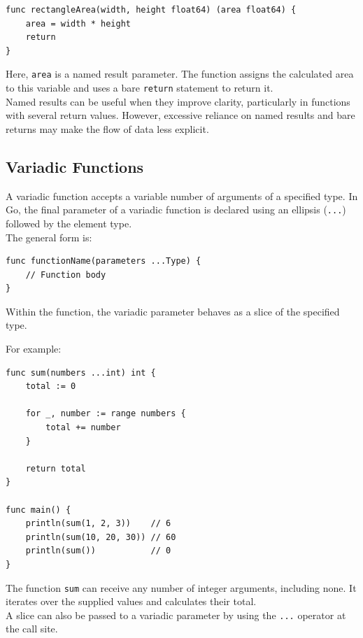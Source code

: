 \begin{lstlisting}
func rectangleArea(width, height float64) (area float64) {
    area = width * height
    return
}
\end{lstlisting}

Here, \texttt{area} is a named result parameter. The function assigns the calculated area to this variable and uses a bare \texttt{return} statement to return it.\\

Named results can be useful when they improve clarity, particularly in functions with several return values. However, excessive reliance on named results and bare returns may make the flow of data less explicit.

\subsection{Variadic Functions}

A variadic function accepts a variable number of arguments of a specified type. In Go, the final parameter of a variadic function is declared using an ellipsis (\texttt{...}) followed by the element type.\\

The general form is:

\begin{lstlisting}
func functionName(parameters ...Type) {
    // Function body
}
\end{lstlisting}

Within the function, the variadic parameter behaves as a slice of the specified type.

For example:

\begin{lstlisting}
func sum(numbers ...int) int {
    total := 0

    for _, number := range numbers {
        total += number
    }

    return total
}

func main() {
    println(sum(1, 2, 3))    // 6
    println(sum(10, 20, 30)) // 60
    println(sum())           // 0
}
\end{lstlisting}

The function \texttt{sum} can receive any number of integer arguments, including none. It iterates over the supplied values and calculates their total.\\

A slice can also be passed to a variadic parameter by using the \texttt{...} operator at the call site.

